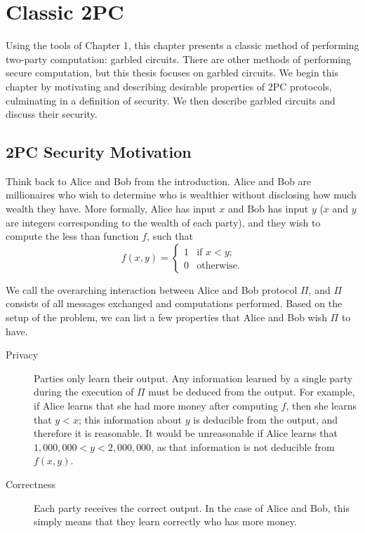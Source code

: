 \chapter{Classic 2PC}

Using the tools of Chapter 1, this chapter presents a classic method of performing two-party computation: garbled circuits.
There are other methods of performing secure computation, but this thesis focuses on garbled circuits. 
We begin this chapter by motivating and describing desirable properties of 2PC protocols, culminating in a definition of security. 
We then describe garbled circuits and discuss their security.

\section{2PC Security Motivation}
Think back to Alice and Bob from the introduction. 
Alice and Bob are millionaires who wish to determine who is wealthier without disclosing how much wealth they have.
More formally, Alice has input $x$ and Bob has input $y$ ($x$ and $y$ are integers corresponding to the wealth of each party), and they wish to compute the less than function $f$, such that 
\begin{equation}
f(x,y) = \left\{
\begin{array}{lr}
    1 & \text{if } x < y \text{;} \\
    0 & \text{otherwise.}
\end{array}
\right.
\end{equation} 

We call the overarching interaction between Alice and Bob protocol $\Pi$, and $\Pi$ consists of all messages exchanged and computations performed.
Based on the setup of the problem, we can list a few properties that Alice and Bob wish $\Pi$ to have.
\begin{description}
    \item[Privacy] 
        Parties only learn their output. 
        Any information learned by a single party during the execution of $\Pi$ must be deduced from the output. 
        For example, if Alice learns that she had more money after computing $f$, then she learns that $y < x$; this information about $y$ is deducible from the output, and therefore it is reasonable.
        It would be unreasonable if Alice learns that $1,000,000 < y < 2,000,000$, as that information is not deducible from $f(x,y)$.
    \item[Correctness] 
        Each party receives the correct output.
        In the case of Alice and Bob, this simply means that they learn correctly who has more money.

\end{description}

